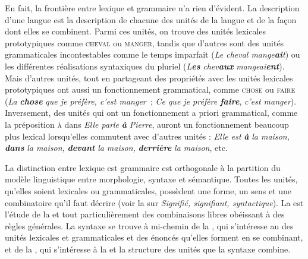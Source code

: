En fait, la frontière entre lexique et grammaire n’a rien d’évident. La description d’une langue est la description de chacune des unités de la langue et de la façon dont elles se combinent. Parmi ces unités, on trouve des unités lexicales prototypiques comme \textsc{cheval} ou \textsc{manger}, tandis que d’autres sont des unités grammaticales incontestables comme le temps imparfait (\textit{Le cheval mange}\textbf{\textit{ai}}\textit{t}) ou les différentes réalisations syntaxiques du pluriel (\textit{L}\textbf{\textit{es}} \textit{chev}\textbf{\textit{aux}} \textit{mangeai}\textbf{\textit{ent}}). Mais d’autres unités, tout en partageant des propriétés avec les unités lexicales prototypiques ont aussi un fonctionnement grammatical, comme \textsc{chose} ou \textsc{faire} (\textit{La} \textbf{\textit{chose}} \textit{que je préfère, c’est manger~}; \textit{Ce que je préfère} \textbf{\textit{faire}}, \textit{c’est manger}). Inversement, des unités qui ont un fonctionnement a priori grammatical, comme la préposition \textsc{à} dans \textit{Elle parle} \textbf{\textit{à}} \textit{Pierre}, auront un fonctionnement beaucoup plus lexical lorsqu’elles commutent avec d’autres unités : \textit{Elle est} \textbf{\textit{à}} \textit{la maison,} \textbf{\textit{dans}} \textit{la maison,} \textbf{\textit{devant}} \textit{la maison,} \textbf{\textit{derrière}} \textit{la maison}, etc.

La distinction entre lexique est grammaire est orthogonale à la partition du modèle linguistique entre morphologie, syntaxe et sémantique. Toutes les unités, qu’elles soient lexicales ou grammaticales, possèdent une forme, un sens et une combinatoire qu’il faut décrire (voir la  sur \textit{Signifié, signifiant, syntactique}). La  est l’étude de la  et tout particulièrement des combinaisons libres obéissant à des règles générales. La syntaxe se trouve à mi-chemin de la , qui s’intéresse au  des unités lexicales et grammaticales et des énoncés qu’elles forment en se combinant, et de la , qui s’intéresse à la  et la structure des unités que la syntaxe combine.


